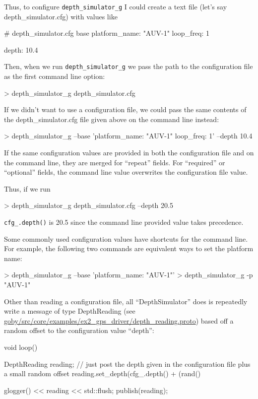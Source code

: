 \documentclass[11pt, letterpaper, oneside]{memoir}
\begin{document}
Thus, to configure \verb|depth_simulator_g| I could create a text file (let's say depth\_simulator.cfg) with values like
\begin{boxedverbatim}
# depth_simulator.cfg
base
{
    platform_name: "AUV-1"
    loop_freq: 1
}

depth: 10.4
\end{boxedverbatim}
\resetbvlinenumber

Then, when we run \verb|depth_simulator_g| we pass the path to the configuration file as the first command line option:
\begin{boxedverbatim}
> depth_simulator_g depth_simulator.cfg 
\end{boxedverbatim}
\resetbvlinenumber

If we didn't want to use a configuration file, we could pass the same contents of the depth\_simulator.cfg file given above on the command line instead:
\begin{boxedverbatim}
> depth_simulator_g --base 'platform_name: "AUV-1" loop_freq: 1' --depth 10.4
\end{boxedverbatim}
\resetbvlinenumber

If the same configuration values are provided in both the configuration file and on the command line, they are merged for ``repeat'' fields. For ``required'' or ``optional'' fields, the command line value overwrites the configuration file value. 

Thus, if we run
\begin{boxedverbatim}
> depth_simulator_g depth_simulator.cfg --depth 20.5
\end{boxedverbatim}
\resetbvlinenumber
\verb|cfg_.depth()| is 20.5 since the command line provided value takes precedence.

Some commonly used configuration values have shortcuts for the command line. For example, the following two commands are equivalent ways to set the platform name:
\begin{boxedverbatim}
> depth_simulator_g --base 'platform_name: "AUV-1"'
> depth_simulator_g -p "AUV-1"
\end{boxedverbatim}
\resetbvlinenumber

Other than reading a configuration file, all ``DepthSimulator'' does is repeatedly write a message of type DepthReading (see \href{http://bazaar.launchpad.net/~goby-dev/goby/trunk/annotate/head:/src/core/examples/ex2_gps_driver/depth_reading.proto}{goby/src/core/examples/ex2\_gps\_driver/depth\_reading.proto}) based off a random offset to the configuration value ``depth'':
\begin{boxedverbatim}
void loop()
    {
       DepthReading reading;
       // just post the depth given in the configuration file plus a small random offset
       reading.set_depth(cfg_.depth() + (rand() %

       glogger() << reading << std::flush;
       publish(reading);    
    }
\end{boxedverbatim}
\resetbvlinenumber
\end{document}
